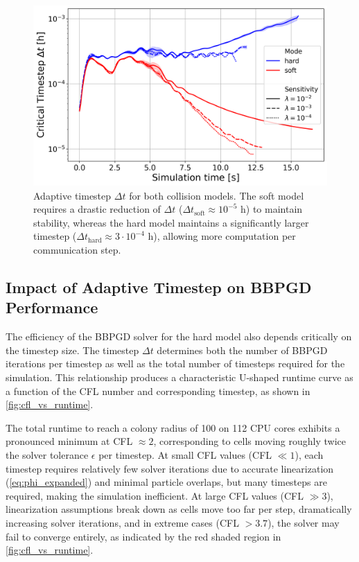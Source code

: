 \documentclass[conference]{IEEEtran}
\begin{document}
\begin{figure}[H]
    \centering
    \includegraphics[width=\linewidth]{figures/comparison_plots/combined_simulation_time [s]_vs_dt.png}
    \caption{Adaptive timestep $\Delta t$ for both collision models. The soft model requires a drastic reduction of $\Delta t$ ($\Delta t_{\text{soft}} \approx 10^{-5}$ h) to maintain stability, whereas the hard model maintains a significantly larger timestep ($\Delta t_{\text{hard}} \approx 3 \cdot 10^{-4}$ h), allowing more computation per communication step.}
    \label{fig:simulation_time_vs_dt}
\end{figure}

\subsection{Impact of Adaptive Timestep on BBPGD Performance}
\label{sec:cfl_analysis}

The efficiency of the BBPGD solver for the hard model also depends critically on the timestep size. The timestep $\Delta t$ determines both the number of BBPGD iterations per timestep as well as the total number of timesteps required for the simulation. This relationship produces a characteristic U-shaped runtime curve as a function of the CFL number and corresponding timestep, as shown in \autoref{fig:cfl_vs_runtime}.

The total runtime to reach a colony radius of 100 on 112 CPU cores exhibits a pronounced minimum at CFL $\approx 2$, corresponding to cells moving roughly twice the solver tolerance $\epsilon$ per timestep. At small CFL values (CFL $\ll 1$), each timestep requires relatively few solver iterations due to accurate linearization (\autoref{eq:phi_expanded}) and minimal particle overlaps, but many timesteps are required, making the simulation inefficient. At large CFL values (CFL $\gg 3$), linearization assumptions break down as cells move too far per step, dramatically increasing solver iterations, and in extreme cases (CFL $> 3.7$), the solver may fail to converge entirely, as indicated by the red shaded region in \autoref{fig:cfl_vs_runtime}.
\end{document}
